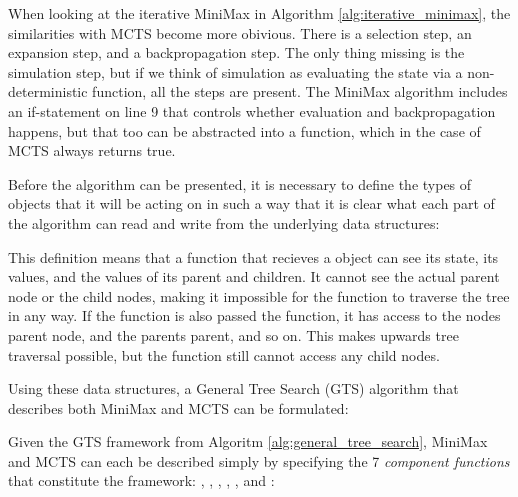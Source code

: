 

When looking at the iterative MiniMax in Algorithm \ref{alg:iterative_minimax}, the similarities with MCTS become more obivious. There is a selection step, an expansion step, and a backpropagation step. The only thing missing is the simulation step, but if we think of simulation as evaluating the state via a non-deterministic function, all the steps are present. The MiniMax algorithm includes an if-statement on line 9 that controls whether evaluation and backpropagation happens, but that too can be abstracted into a  function, which in the case of MCTS always returns true. 

Before the algorithm can be presented, it is necessary to define the types of objects that it will be acting on in such a way that it is clear what each part of the algorithm can read and write from the underlying data structures:



This definition means that a function that recieves a  object can see its state, its values, and the values of its parent and children. It cannot see the actual parent node or the child nodes, making it impossible for the function to traverse the tree in any way. If the function is also passed the  function, it has access to the nodes parent node, and the parents parent, and so on. This makes upwards tree traversal possible, but the function still cannot access any child nodes.

Using these data structures, a General Tree Search (GTS) algorithm that describes both MiniMax and MCTS can be formulated:



Given the GTS framework from Algoritm \ref{alg:general_tree_search}, MiniMax and MCTS can each be described simply by specifying the 7 \textit{component functions} that constitute the framework: , , , , , and :

